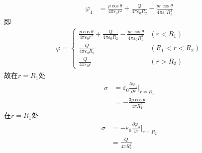 \documentclass{phyasgn}
\begin{document}
\begin{sol}[4]
  \begin{align*}
    \varphi_1&=\frac{p\cos\theta}{4\pi\varepsilon_0r^2}+\frac{Q}{4\pi\varepsilon_0R_2}-\frac{pr\cos\theta}{4\pi\varepsilon_0R_1^3}
  \end{align*}
  即
  \begin{align*}
    \varphi=\left\{\begin{matrix}
      \frac{p\cos\theta}{4\pi\varepsilon_0r^2}+\frac{Q}{4\pi\varepsilon_0R_2}-\frac{pr\cos\theta}{4\pi\varepsilon_0R_1^3}&(r<R_1)\\
      \frac{Q}{4\pi\varepsilon_0R_2}&(R_1<r<R_2)\\
      \frac{Q}{4\pi\varepsilon_0r}&(r>R_2)
    \end{matrix}\right.
  \end{align*}
  故在$r=R_1$处
  \begin{align*}
    \sigma&=\varepsilon_0\frac{\partial \varphi_1}{\partial r}|_{r=R_1}\\
    &=-\frac{3p\cos\theta}{4\pi R_1^3}
  \end{align*}
  在$r=R_1$处
  \begin{align*}
    \sigma&=-\varepsilon_0\frac{\partial \varphi_3}{\partial r}|_{r=R_2}\\
    &=\frac{Q}{4\pi R_2^2}
  \end{align*}
\end{sol} 
\end{document}
